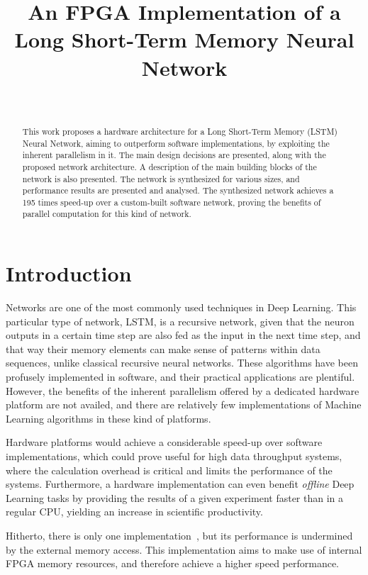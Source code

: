 \documentclass{IEEEtran}
\title{An FPGA Implementation of a Long Short-Term Memory Neural Network}
\author{\IEEEauthorblockN{Jose Pedro Castro Fonseca} \\ 
\IEEEauthorblockA{Faculty of Engineering University of Porto \\
Porto, Portugal}}
\begin{document}
\maketitle

\begin{abstract}
This work proposes a hardware architecture for a Long Short-Term Memory (LSTM) Neural Network, aiming
to outperform software implementations, by exploiting the inherent parallelism in it.  
The main design decisions are presented, along with the proposed network architecture. A description of the main
building blocks of the network is also presented. The network is synthesized for various sizes,
and performance results are presented and analysed. The synthesized network achieves a 195 times speed-up
over a custom-built software network, proving the benefits of parallel computation for this kind of network.
\end{abstract}


\section{Introduction}\label{sec:intro}
 Networks are one of the most commonly used techniques in Deep Learning. This
particular type of network, LSTM, is a recursive network, given that the neuron outputs in a certain 
time step are also fed as the input in the next time step, and that way their memory elements can make
sense of patterns within data sequences, unlike classical recursive neural networks.
These algorithms have been profusely implemented in software, and their practical applications are plentiful. 
However, the benefits of the inherent parallelism offered by a dedicated hardware
platform are not availed, and there are relatively few implementations of Machine Learning algorithms in 
these kind of platforms. 

Hardware platforms would achieve a considerable speed-up over software implementations, which could prove
useful for high data throughput systems, where the calculation overhead is critical and limits the performance of the systems.
Furthermore, a hardware implementation can even benefit \emph{offline} Deep Learning tasks by providing the results
of a given experiment faster than in a regular CPU, yielding an increase in scientific productivity.

Hitherto, there is only one implementation~\cite{Chang15}, but its performance is undermined
by the external memory access. This implementation aims to make use of internal FPGA memory resources, and therefore
achieve a higher speed performance.
\end{document}
